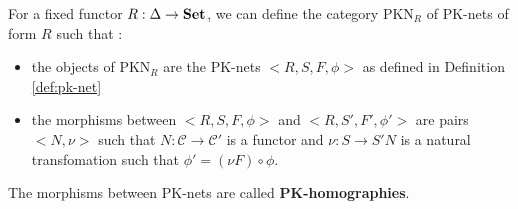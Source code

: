 \begin{defn}
    For a fixed functor $R: \Delta \rightarrow \bf Set$, we can define the category $ \text{PKN}_R$ of PK-nets of form $R$ such that :
    \begin{itemize}
        \item the objects of $\text{PKN}_R$\label{nomencl:PKNR} are the PK-nets $\big<R,S,F,\phi\big>$ as defined in Definition \ref{def:pk-net}
        \item the morphisms between $\big<R,S,F,\phi\big>$ and $\big<R,S',F',\phi'\big>$ are pairs $\big< N,\nu\big>$ such that $N : \mathcal{C} \rightarrow \mathcal{C}'$ is a functor and $\nu : S \rightarrow S'N$ is a natural transfomation such that $\phi' = (\nu F)\circ \phi$.
    \end{itemize}
\end{defn}

\begin{note}
    The morphisms between PK-nets are called \textbf{PK-homographies}.
\end{note}


